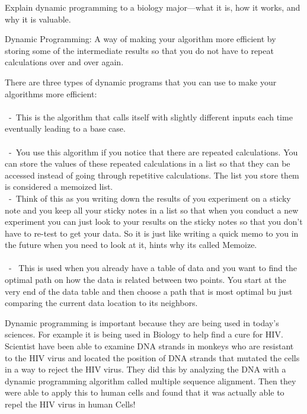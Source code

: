 \documentclass[12pt]{article}
\newcommand\tab[1][1cm]{\hspace*{#1}}
\begin{document}
\renewcommand{\headrulewidth}{0.5pt}

\phantom{Test}
Explain dynamic programming to a biology major---what it is, how it works, and why it is valuable.

Dynamic Programming: A way of making your algorithm more efficient by storing some of the intermediate results so that you do not have to repeat calculations over and over again.

There are three types of dynamic programs that you can use to make your algorithms more efficient:\\
\tab {\bf 1.~Recursion }\\
\tab~-~This is the algorithm that calls itself with slightly different inputs each time eventually leading to a base case.\\
\tab {\bf 2.~Store(Memoize)}\\
\tab ~-~You use this algorithm if you notice that there are repeated calculations. You can store the values of these repeated calculations in a list so that they can be accessed instead of going through repetitive calculations. The list you store them is considered a memoized list. \\
\tab ~-~Think of this as you writing down the results of you experiment on a sticky note and you keep all your sticky notes in a list so that when you conduct a new experiment you can just look to your results on the sticky notes so that you don't have to re-test to get your data. So it is just like writing a quick memo to you in the future when you need to look at it, hints why its called Memoize. \\
\tab {\bf 3.~Bottom-up}\\
\tab ~-~ This is used when you already have a table of data and you want to find the optimal path on how the data is related between two points. You start at the very end of the data table and then choose a path that is most optimal bu just comparing the current data location to its neighbors. 

Dynamic programming is important because they are being used in today's sciences. For example it is being used in Biology to help find a cure for HIV. Scientist have been able to examine DNA strands in monkeys who are resistant to the HIV virus and located the position of DNA strands that mutated the cells in a way to reject the HIV virus. They did this by analyzing the DNA with a dynamic programming algorithm called multiple sequence alignment. Then they were able to apply this to human cells and found that it was actually able to repel the HIV virus in human Cells!





\mbox{}
\newpage
\pagebreak
\end{document}
